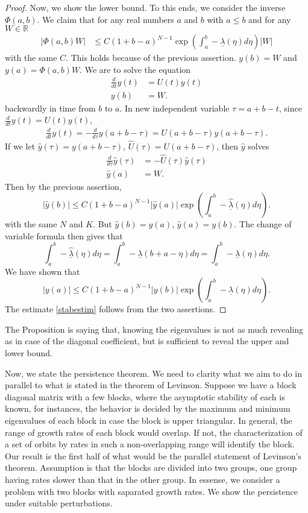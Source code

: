 \documentclass[a4paper,11pt]{article}
\newcommand{\udl}{\underline{\lambda}}
\theoremstyle{remark}
\begin{document}
\begin{proof}
 Now, we show the lower bound. To this ends, we consider the inverse $\Phi(a,b)$. We claim that for any real numbers $a$ and $b$ with $a \le b$ and for any $W\in \mathbb{R}$
\begin{align*}
|\Phi(a,b)W| &\le C (1 + b-a)^{N-1}\exp\left(\int_a^b -\udl(\eta) d\eta\right)|W|\end{align*}
with the same $C$. This holds because of the previous assertion. $y(b)= W$ and $y(a) = \Phi(a,b)W$. We are to solve the equation 
  \begin{align*}
  \frac{d}{dt}{y}(t) &= {U}(t){y}(t)\\
  {y}(b) &= W.
 \end{align*}
 backwardly in time from $b$ to $a$. In new independent variable $\tau = a+b-t$, since $\frac{d}{dt}y(t)=U(t)y(t)$,
 \begin{align*}
  \frac{d}{dt}y(t)=-\frac{d}{d\tau}y(a+b-\tau) = U(a+b-\tau)y(a+b-\tau).
 \end{align*}
 If we let $\hat{y}(\tau)=y(a+b-\tau)$, $\hat{U}(\tau)=U(a+b-\tau)$, then $\hat{y}$ solves
 \begin{align*}
  \frac{d}{d\tau}\hat{y}(\tau) &= -\hat{U}(\tau)\hat{y}(\tau)\\
  \hat{y}(a) &= W.
 \end{align*}
Then by the previous assertion,
 $$|\hat{y}(b)| \le C(1+b-a)^{N-1}|\hat{y}(a)| \exp\left(\int_a^b -\hat{\udl}(\eta) d\eta\right).$$
 with the same $N$ and $K$. But $\hat{y}(b)=y(a)$, $\hat{y}(a)=y(b)$. The change of variable formula then gives that $$\int_a^b -\hat{\udl}(\eta)d\eta = \int_a^b -{\udl}(b+a-\eta)d\eta
=\int_a^b -\udl(\eta) d\eta.$$ We have shown that
$$|{y}(a)| \le C(1+b-a)^{N-1}|{y}(b)| \exp\left(\int_a^b -{\udl}(\eta) d\eta\right).$$
The estimate \eqref{stabestim} follows from the two assertions.
\end{proof}

The Proposition is saying that, knowing the eigenvalues is not as much revealing as in case of the diagonal coefficient, but is sufficient to reveal the upper and lower bound. 


Now, we state the persistence theorem. We need to clarity what we aim to do in parallel to what is stated in the theorem of Levinson. Suppose we have a block diagonal matrix with a few   blocks, where the asymptotic stability of each is known, for instances, the behavior is decided by the maximum and minimum eigenvalues of each block in case the block is upper triangular. In general, the range of growth rates of each block would overlap. If not, the  characterization of a set of orbits by rates in such a non-overlapping range will identify the block. Our result is the first half of what would be the parallel statement of Levinson's theorem. Assumption is that the blocks are divided into two groups, one group having rates slower than that in the other group. In essense, we consider a problem with two blocks with saparated growth rates. We show the persistence under suitable perturbations.
\end{document}
